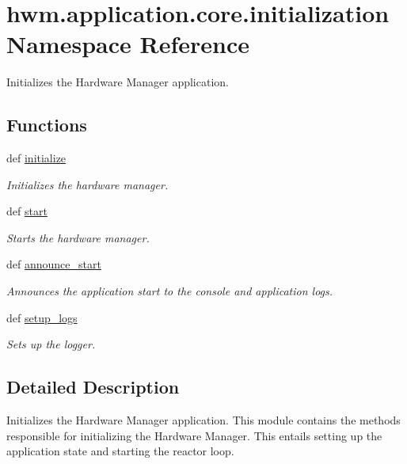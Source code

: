 \hypertarget{namespacehwm_1_1application_1_1core_1_1initialization}{\section{hwm.\-application.\-core.\-initialization Namespace Reference}
\label{namespacehwm_1_1application_1_1core_1_1initialization}
}


Initializes the Hardware Manager application.  


\subsection*{Functions}
\begin{DoxyCompactItemize}
\item 
def \hyperlink{namespacehwm_1_1application_1_1core_1_1initialization_a8fdf3f210b2000e32af67c90b5f187a8}{initialize}
\begin{DoxyCompactList}\small\item\em Initializes the hardware manager. \end{DoxyCompactList}\item 
def \hyperlink{namespacehwm_1_1application_1_1core_1_1initialization_a0663269cd19932b10657d4eecdbeac07}{start}
\begin{DoxyCompactList}\small\item\em Starts the hardware manager. \end{DoxyCompactList}\item 
def \hyperlink{namespacehwm_1_1application_1_1core_1_1initialization_a916f062a12b8d6dc3587a12165075418}{announce\-\_\-start}
\begin{DoxyCompactList}\small\item\em Announces the application start to the console and application logs. \end{DoxyCompactList}\item 
def \hyperlink{namespacehwm_1_1application_1_1core_1_1initialization_a6f973db9420db8a10c6a479de5689329}{setup\-\_\-logs}
\begin{DoxyCompactList}\small\item\em Sets up the logger. \end{DoxyCompactList}\end{DoxyCompactItemize}


\subsection{Detailed Description}
Initializes the Hardware Manager application. This module contains the methods responsible for initializing the Hardware Manager. This entails setting up the application state and starting the reactor loop. 

